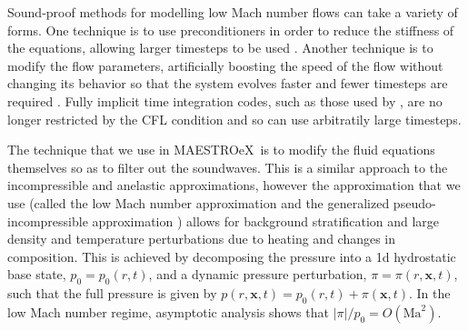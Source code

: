 \documentclass[a4paper]{jpconf}
\newcommand{\maestroex}{{\sffamily MAESTROeX}}
\begin{document}
Sound-proof methods for modelling low Mach number flows can take a variety of forms. One technique is to use preconditioners in order to reduce the stiffness of the equations, allowing larger timesteps to be used \cite{Miczek2014,Barsukow2016}. Another technique is to modify the flow parameters, artificially boosting the speed of the flow without changing its behavior so that the system evolves faster and fewer timesteps are required \citep{Rempel2005,Hotta2012}. Fully implicit time integration codes, such as those used by \cite{Viallet2011,Viallet2015,Goffrey2016}, are no longer restricted by the CFL condition and so can use arbitratily large timesteps.

The technique that we use in \maestroex~is to modify the fluid equations themselves so as to filter out the soundwaves. This is a similar approach to the incompressible \cite{Boussinesq1901} and anelastic \cite{Ogura1962a,Gough1968,Durran1989} approximations, however the approximation that we use (called the low Mach number approximation \cite{Day2000,Almgren2006a,Nonaka2010} and the generalized pseudo-incompressible approximation \cite{Vasil2013}) allows for background stratification and large density and temperature perturbations due to heating and changes in composition. This is achieved by decomposing the pressure into a 1d hydrostatic base state, $p_0 = p_0(r, t)$, and a dynamic pressure perturbation, $\pi = \pi(r, \bm{x}, t)$, such that the full pressure is given by $p(r, \bm{x}, t) = p_0(r, t) + \pi(\bm{x}, t)$. In the low Mach number regime, asymptotic analysis shows that $|\pi|/p_0 = O(\mathrm{Ma}^2)$. 
\end{document}

